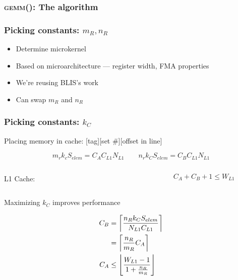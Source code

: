 \documentclass{beamer}
\DeclarePairedDelimiter\ceil{\lceil}{\rceil}
\DeclarePairedDelimiter\floor{\lfloor}{\rfloor}
\newcommand*{\gemm}{{\textsc{gemm()}}}
\begin{document}
\begin{frame}
  \frametitle{\gemm{}: The algorithm}
  \begin{adjustbox}{max size={!}{0.87\textheight},center}
  \begin{tikzpicture}
    
  \end{tikzpicture}
  \end{adjustbox}
\end{frame}

\begin{frame}
  \frametitle{Picking constants: $m_R, n_R$}
  \begin{itemize}
  \item Determine microkernel
  \item Based on microarchitecture --- register width, FMA properties
  \item We're reusing BLIS's work
  \item Can swap $m_R$ and $n_R$
  \end{itemize}
\end{frame}

\begin{frame}
  \frametitle{Picking constants: $k_C$}
  Placing memory in cache: [tag][set \#][offset in line]

  \begin{equation*}
    m_rk_cS_{elem} = C_AC_{L1}N_{L1} \qquad n_rk_CS_{elem} = C_BC_{L1}N_{L1}
  \end{equation*}

  \begin{columns}
    \begin{column}{0.1\textwidth}
      L1 Cache:
    \end{column}
    \begin{column}{0.5\textwidth}
      \centering
    \end{column}
    \begin{column}{0.25\textwidth}
      \begin{equation*}
        C_A + C_B + 1 \leq W_{L1}
      \end{equation*}
    \end{column}
  \end{columns}
  \begin{center}
    Maximizing $k_C$ improves performance
  \end{center}

  \begin{align*}
    C_B &= \ceil*{\frac{n_Rk_CS_{elem}}{N_{L1}C_{L1}}}\\
        &= \ceil*{\frac{n_R}{m_R}C_A}\\
    C_A &\leq \floor*{\frac{W_{L1} - 1}{1 + \frac{n_R}{m_R}}}
  \end{align*}
\end{frame}
\end{document}
